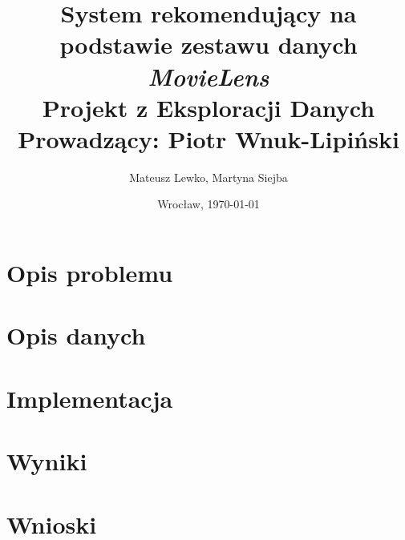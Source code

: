\documentclass[11pt,wide]{mwart}
\date{Wrocław, \today}
\title{\Large\textbf{System rekomendujący na podstawie zestawu danych \textit{MovieLens}}\\Projekt z Eksploracji Danych\\[1ex] \small Prowadzący: Piotr Wnuk-Lipiński}
\author{Mateusz Lewko, Martyna Siejba}
\begin{document}
\maketitle
\thispagestyle {empty}

\tableofcontents

\section{Opis problemu}

\section{Opis danych}

\section{Implementacja}

\section{Wyniki}

\section{Wnioski}
\end{document}
